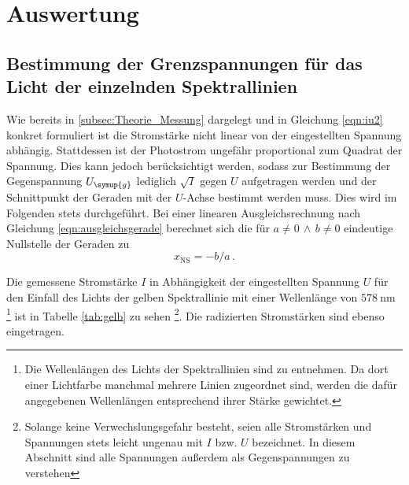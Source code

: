 \section{Auswertung}
\label{sec:Auswertung}
\subsection{Bestimmung der Grenzspannungen für das Licht der einzelnden Spektrallinien}
\label{subsec:grenzspannungen}
Wie bereits in \ref{subsec:Theorie_Messung} dargelegt und in Gleichung \eqref{eqn:iu2} konkret
formuliert ist die Stromstärke nicht linear von der eingestellten Spannung abhängig.
Stattdessen ist der Photostrom ungefähr proportional zum Quadrat der Spannung. Dies
kann jedoch berücksichtigt werden, sodass zur Bestimmung der Gegenspannung $U_{\symup{g}}$
lediglich $\sqrt{I}$ gegen $U$ aufgetragen werden und der Schnittpunkt der Geraden
mit der $U$-Achse bestimmt werden muss. Dies wird im Folgenden stets durchgeführt.
Bei einer linearen Ausgleichsrechnung nach Gleichung
\eqref{eqn:ausgleichsgerade} berechnet sich die für $a \neq 0 \, \land \, b \neq 0$ eindeutige
Nullstelle der Geraden zu
\begin{equation*}
  x_\text{NS} = -b/a\,.
  \label{eqn:ns}
\end{equation*}

Die gemessene Stromstärke $I$ in Abhängigkeit der eingestellten Spannung $U$ für
den Einfall des Lichts der gelben Spektrallinie mit einer Wellenlänge von $\SI{578}{\nano\meter}$
\footnote{Die Wellenlängen des Lichts der Spektrallinien sind \cite{Versuchsanleitung} zu entnehmen.
Da dort einer Lichtfarbe manchmal mehrere Linien zugeordnet sind, werden die dafür angegebenen
Wellenlängen entsprechend ihrer Stärke gewichtet.}
ist in Tabelle \ref{tab:gelb} zu sehen \footnote{Solange keine Verwechslungsgefahr
besteht, seien alle Stromstärken und Spannungen stets leicht ungenau mit $I$ bzw. $U$ bezeichnet.
In diesem Abschnitt sind alle Spannungen außerdem als Gegenspannungen zu verstehen}. Die radizierten
Stromstärken sind ebenso eingetragen.

